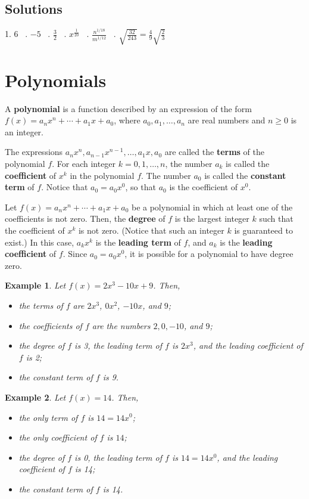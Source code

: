 \documentclass[11pt]{book}               %
\newtheorem{example}{Example}
\begin{document}
\subsection{Solutions} 
1.  $6 $ \  .  $ -5 $ \ .  $ \frac{3}{2} $ \  .  $ x^\frac{1}{20} $ \ . $\displaystyle\frac{ n^{1/18}} {  m^{1/12}} $ \ . $ \sqrt{\frac{32}{243}}  = \frac{4}{9}\sqrt{\frac{2}{3}} $

\newpage
\label{section-polynomials}
\section{Polynomials}

A \textbf{polynomial} is a function 
described by an expression of the form $f(x)=a_nx^n + \cdots + a_1x+a_0$, 
where $a_0, a_1,\ldots,a_n$ are real numbers and $n\geq0$ is an integer. 

The expressions $a_n x^n, a_{n-1}x^{n-1}, \ldots, a_1x, a_0$ are called the
\textbf{terms} of the polynomial $f$.
For each integer $k = 0, 1, \ldots, n$, the number $a_k$ is called the \textbf{coefficient} of $x^k$ in the polynomial $f$.
The number $a_0$ is called the \textbf{constant term} of $f$.
Notice that $a_0 = a_0 x^0$, so that $a_0$ is the coefficient of $x^0$.

Let $f(x) =a_nx^n + \cdots + a_1x+a_0$ be a polynomial in 
which at least one of the coefficients is not zero.
Then, the 
\textbf{degree} of $f$ is the largest integer $k$ such that the coefficient of $x^k$ is not zero.
(Notice that such an integer $k$ is guaranteed to exist.)
In this case, $a_kx^k$ is the \textbf{leading term} of $f$, and $a_k$ is the \textbf{leading coefficient} of $f$.
Since $a_0 = a_0 x^0$, it is possible for a polynomial to have degree zero.


\begin{example} Let  $f(x)=2x^3-10x+9$. Then,
\normalfont
\begin{itemize}
\item the terms of $f$ are $2x^3$, $0x^2$, $-10x$, and $9$;
\item the coefficients of $f$ are the numbers $2, 0, -10$, and $9$;
\item the degree of $f$ is 3, the leading term of $f$ is $2x^3$,  and the leading coefficient of $f$ is 2;
\item the constant term of $f$ is 9.
\end{itemize}
\end{example}

\begin{example} Let $f(x) = 14$.  Then,
\normalfont
\begin{itemize}
\item the only term of $f$ is $14 = 14x^0$;
\item the only coefficient of $f$ is $14$;
\item the degree of $f$ is 0, the leading term of $f$ is $14 = 14x^0$,  and the leading coefficient of $f$ is 14;
\item the constant term of $f$ is 14.
\end{itemize}
\end{example}
\end{document}
